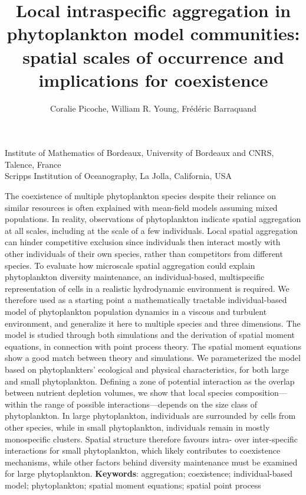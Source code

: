 \documentclass[english]{article}
\date{}
\newcommand{\lyxaddress}[1]{
	\par {\raggedright #1
	\vspace{1.4em}
	\noindent\par}
}
\renewenvironment{abstract}
 {\small
  \begin{center}
  \bfseries \abstractname\vspace{-.5em}\vspace{0pt}
  \end{center}
  \list{}{
    \setlength{\leftmargin}{.5cm}%
    \setlength{\rightmargin}{\leftmargin}%
  }%
  \item\relax}
 {\endlist}
\begin{document}
\title{Local intraspecific aggregation in phytoplankton model communities:
spatial scales of occurrence and implications for coexistence}
\author{Coralie Picoche\textonesuperior , William R. Young\texttwosuperior ,
Fr\'e{}d\'e{}ric Barraquand\textonesuperior{}}
\maketitle

\lyxaddress{\noindent \begin{center}
\textonesuperior Institute of Mathematics of Bordeaux, University
of Bordeaux and CNRS, Talence, France\\
\texttwosuperior Scripps Institution of Oceanography, La Jolla, California,
USA
\par\end{center}}

\vspace{-1cm}
\begin{abstract}
The coexistence of multiple phytoplankton species despite their reliance
on similar resources is often explained with mean-field models assuming
mixed populations. In reality, observations of phytoplankton indicate
spatial aggregation at all scales, including at the scale of a few
individuals. Local spatial aggregation can hinder competitive exclusion
since individuals then interact mostly with other individuals of their
own species, rather than competitors from different species. To evaluate
how microscale spatial aggregation could explain phytoplankton diversity
maintenance, an individual-based, multispecific representation of
cells in a realistic hydrodynamic environment is required. We therefore
used as a starting point a mathematically tractable individual-based
model of phytoplankton population dynamics in a viscous and turbulent
environment, and generalize it here to multiple species and three
dimensions. The model is studied through both simulations and the
derivation of spatial moment equations, in connection with point process
theory. The spatial moment equations show a good match between theory
and simulations. We parameterized the model based on phytoplankters\textquoteright{}
ecological and physical characteristics, for both large and small
phytoplankton. Defining a zone of potential interaction as the overlap
between nutrient depletion volumes, we show that local species composition---within
the range of possible interactions---depends on the size class of
phytoplankton. In large phytoplankton, individuals are surrounded
by cells from other species, while in small phytoplankton, individuals
remain in mostly monospecific clusters. Spatial structure therefore
favours intra- over inter-specific interactions for small phytoplankton,
which likely contributes to coexistence mechanisms, while other factors
behind diversity maintenance must be examined for large phytoplankton.
\end{abstract}
\textbf{Keywords}: aggregation; coexistence; individual-based model;
phytoplankton; spatial moment equations; spatial point process 
\end{document}
